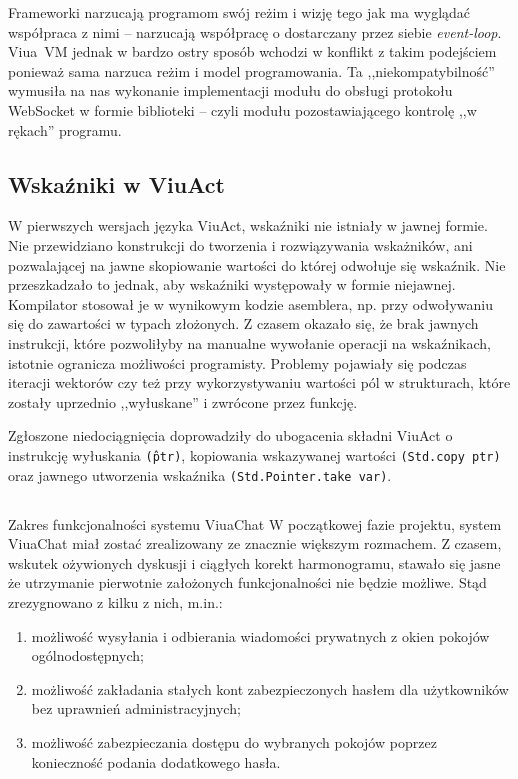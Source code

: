 Frameworki narzucają programom swój reżim i wizję tego jak ma wyglądać
współpraca z nimi -- narzucają współpracę o dostarczany przez siebie
\emph{event-loop}. Viua~VM jednak w bardzo ostry sposób wchodzi w konflikt z
takim podejściem ponieważ sama narzuca reżim i model programowania.  Ta
,,niekompatybilność'' wymusiła na nas wykonanie implementacji modułu do obsługi
protokołu WebSocket w formie biblioteki -- czyli modułu pozostawiającego
kontrolę ,,w rękach'' programu.

\subsection{Wskaźniki w ViuAct}
W pierwszych wersjach języka ViuAct, wskaźniki nie istniały w jawnej formie.
Nie przewidziano konstrukcji do tworzenia i rozwiązywania wskażników, ani
pozwalającej na jawne skopiowanie wartości do której odwołuje się wskaźnik.
Nie przeszkadzało to jednak, aby wskaźniki występowały w formie niejawnej.
Kompilator stosował je w wynikowym kodzie asemblera, np. przy odwoływaniu się do zawartości w typach złożonych. Z czasem okazało się, że brak jawnych instrukcji,
które pozwoliłyby na manualne wywołanie operacji na wskaźnikach, istotnie
ogranicza możliwości programisty. Problemy pojawiały się podczas iteracji
wektorów czy też przy wykorzystywaniu wartości pól w strukturach,
które zostały uprzednio ,,wyłuskane'' i zwrócone przez funkcję.

Zgłoszone niedociągnięcia doprowadziły do ubogacenia składni ViuAct o
instrukcję wyłuskania \texttt{(\^ ptr)}, kopiowania wskazywanej wartości
\texttt{(Std.copy ptr)} oraz jawnego utworzenia wskaźnika
 \texttt{(Std.Pointer.take var)}.

 \subsection{}{Zakres funkcjonalności systemu ViuaChat}
 W początkowej fazie projektu, system ViuaChat miał zostać zrealizowany ze
 znacznie większym rozmachem. Z czasem, wskutek ożywionych dyskusji i ciągłych
 korekt harmonogramu, stawało się jasne że utrzymanie pierwotnie założonych
 funkcjonalności nie będzie możliwe. Stąd zrezygnowano z kilku z nich, m.in.:

 \begin{enumerate}
   \item możliwość wysyłania i odbierania wiadomości prywatnych z okien
   pokojów ogólnodostępnych;
   \item możliwość zakładania stałych kont zabezpieczonych hasłem dla użytkowników bez uprawnień administracyjnych;
   \item możliwość zabezpieczania dostępu do wybranych
   pokojów poprzez konieczność podania dodatkowego hasła.
 \end{enumerate}


